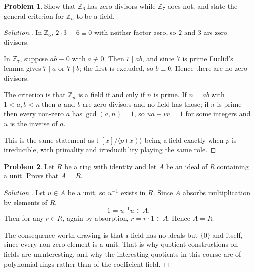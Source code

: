 \documentclass[11pt,a4paper]{article}
\theoremstyle{definition}
\newtheorem{problemx}{Problem}[subsection]
\newenvironment{problem}{\begin{problemx}}{\end{problemx}}
\newenvironment{solution}
  {\renewcommand{\qedsymbol}{}\begin{proof}[\textit{Solution}.]}
  {\end{proof}}
\begin{document}
\begin{problem}
Show that $\mathbb{Z}_{6}$ has zero divisors while $\mathbb{Z}_{7}$ does not,
and state the general criterion for $\mathbb{Z}_n$ to be a field.
\end{problem}
\begin{solution}
In $\mathbb{Z}_6$, $2\cdot3 = 6 \equiv 0$ with neither factor zero, so $2$ and
$3$ are zero divisors.

In $\mathbb{Z}_7$, suppose $ab\equiv0$ with $a\not\equiv0$. Then $7\mid ab$, and
since $7$ is prime Euclid's lemma gives $7\mid a$ or $7\mid b$; the first is
excluded, so $b\equiv0$. Hence there are no zero divisors.

The criterion is that $\mathbb{Z}_n$ is a field if and only if $n$ is prime. If
$n = ab$ with $1<a,b<n$ then $a$ and $b$ are zero divisors and no field has
those; if $n$ is prime then every non-zero $a$ has $\gcd(a,n)=1$, so
$ua+vn=1$ for some integers and $u$ is the inverse of $a$.

This is the same statement as $\mathbb{F}[x]/\langle p(x)\rangle$ being a field
exactly when $p$ is irreducible, with primality and irreducibility playing the
same role.
\end{solution}

\begin{problem}
Let $R$ be a ring with identity and let $A$ be an ideal of $R$ containing a
unit. Prove that $A=R$.
\end{problem}
\begin{solution}
Let $u\in A$ be a unit, so $u^{-1}$ exists in $R$. Since $A$ absorbs
multiplication by elements of $R$,
$$1 = u^{-1}u \in A .$$
Then for any $r\in R$, again by absorption, $r = r\cdot1 \in A$. Hence
$A = R$.

The consequence worth drawing is that a field has no ideals but $\{0\}$ and
itself, since every non-zero element is a unit. That is why quotient
constructions on fields are uninteresting, and why the interesting quotients in
this course are of polynomial rings rather than of the coefficient field.
\end{solution}
\end{document}
